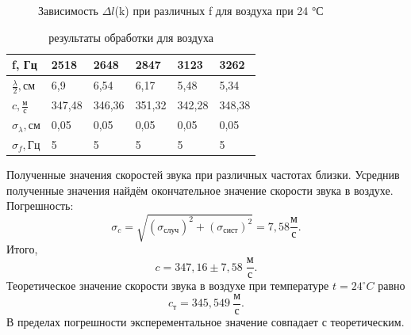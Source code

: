 \documentclass[a4paper,11pt]{extarticle} %
\begin{document}
			
	\begin{figure}[ht!]
    \caption{Зависимость $\Delta l$(k) при различных f для воздуха при 24 °С}
	\end{figure}
		
		\begin{table}
		\begin{center}
		\begin{tabular}{|l|l|l|l|l|l|}
			\hline
			f, Гц & 2518 & 2648& 2847 & 3123 & 3262
			\\
			
			\hline
			$\frac{\lambda}{2},{\text{см}}$ & 6,9 & 6,54 & 6,17 & 5,48 & 5,34
			\\
			\hline
			$c,\frac{\text{м}}{\text{с}}$ & 347,48 & 346,36 & 351,32 & 342,28 & 348,38
			\\
			\hline
			$\sigma_{\lambda}, {\text{см}} $ & 0,05 & 0,05 & 0,05 & 0,05 & 0,05
			\\
			\hline
			$\sigma_{f},{\text{Гц}}$ & 5 & 5 & 5 & 5 & 5
			\\
			\hline
		\end{tabular}
		\caption{результаты обработки для воздуха}
		\end{center}
		\end{table}
		\newpage
		Полученные значения скоростей звука при различных частотах близки.
		Усреднив полученные значения найдём окончательное значение скорости звука в воздухе. Погрешность: $$\sigma_{c} = \sqrt{(\sigma_{\text{случ}})^2+(\sigma_{\text{сист}})^2} = 7,58\frac{\text{м}}{\text{с}}.$$
		Итого, $$c = 347,16 \pm 7,58 \; \frac{\text{м}}{\text{с}}.$$
		Теоретическое значение скорости звука в воздухе при температуре $t = 24 ^\circ C$ равно $$c_{\text{т}} = 345,549 \: \frac{\text{м}}{\text{с}}.$$
		В пределах погрешности эксперементальное значение совпадает с теоретическим.
		
\end{document}
